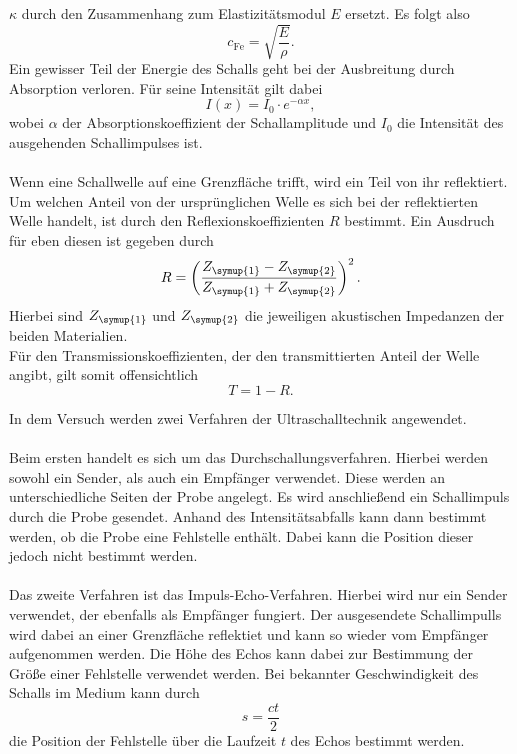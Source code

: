 $\kappa$ durch den Zusammenhang zum Elastizitätsmodul $E$ ersetzt. Es folgt also
\begin{equation}
    c_{\mathrm{Fe}} = \sqrt{\frac{E}{\rho}}.
\end{equation}
Ein gewisser Teil der Energie des Schalls geht bei der Ausbreitung durch Absorption verloren. Für seine Intensität gilt dabei
\begin{equation}
    \label{eqn:Dämpfung}
    I(x) = I_0 \cdot e^{-\alpha x},
\end{equation}
wobei $\alpha$ der Absorptionskoeffizient der Schallamplitude und $I_0$ die Intensität des ausgehenden 
Schallimpulses ist.\\
\\
Wenn eine Schallwelle auf eine Grenzfläche trifft, wird ein Teil von ihr reflektiert. Um welchen Anteil von der ursprünglichen Welle es sich bei der
reflektierten Welle handelt, ist durch den Reflexionskoeffizienten $R$ bestimmt. Ein Ausdruch für eben diesen ist gegeben durch
\begin{equation}
    R = \left(\frac{Z_{\symup{1}}- Z_{\symup{2}}}{Z_{\symup{1}}+Z_{\symup{2}}}\right)^2.
\end{equation}
Hierbei sind $Z_{\symup{1}}$ und $Z_{\symup{2}}$ die jeweiligen akustischen Impedanzen der beiden Materialien. \\
Für den Transmissionskoeffizienten, der den transmittierten Anteil der Welle angibt, gilt somit offensichtlich
\begin{equation}
    T = 1 - R.
\end{equation}


\label{sec:Ultraschallverfahren}
In dem Versuch werden zwei Verfahren der Ultraschalltechnik angewendet.\\ \\
Beim ersten handelt es sich um das Durchschallungsverfahren. Hierbei werden sowohl ein Sender, als auch ein Empfänger verwendet. Diese werden an unterschiedliche
Seiten der Probe angelegt. Es wird anschließend ein Schallimpuls durch die Probe gesendet. Anhand des Intensitätsabfalls kann dann bestimmt werden, ob die Probe eine
Fehlstelle enthält. Dabei kann die Position dieser jedoch nicht bestimmt werden.\\ \\
Das zweite Verfahren ist das Impuls-Echo-Verfahren. Hierbei wird nur ein Sender verwendet, der ebenfalls als Empfänger fungiert. Der ausgesendete Schallimpulls wird dabei
an einer Grenzfläche reflektiet und kann so wieder vom Empfänger aufgenommen werden. Die Höhe des Echos kann dabei zur Bestimmung der Größe einer Fehlstelle verwendet
werden. Bei bekannter Geschwindigkeit des Schalls im Medium kann durch
\begin{equation}
    \label{eqn:Strecke}
    s = \frac{ct}{2}
\end{equation}
die Position der Fehlstelle über die Laufzeit $t$ des Echos bestimmt werden.


